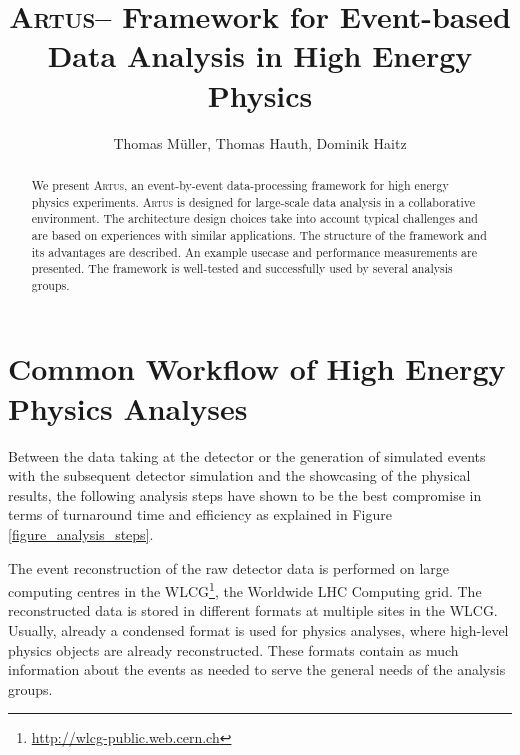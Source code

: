 \documentclass[3p]{elsarticle}
\newcommand{\software}[1]{\textsc{#1}\xspace}
\newcommand{\artus}{\software{Artus}}
\begin{document}
\begin{frontmatter}
\title{\artus -- Framework for Event-based Data Analysis in High Energy Physics}

\author[kit]{Thomas M\"uller, Thomas Hauth, Dominik Haitz}
\address[kit]{Karlsruhe Institute of Technology, Wolfgang-Gaede-Stra\ss{}e 1, D-76131 Karlsruhe}

\begin{abstract}
We present \artus, an event-by-event data-processing framework for high energy physics experiments. \artus is designed for large-scale data analysis in a collaborative environment.
The architecture design choices take into account typical challenges and are based on experiences with similar applications.
The structure of the framework and its advantages are described.
An example usecase and performance measurements are presented.
The framework is well-tested and successfully used by several analysis groups.
\end{abstract}

\end{frontmatter}


\section{Common Workflow of High Energy Physics Analyses \label{section_artus_analysis_workflow}}

Between the data taking at the detector or the generation of simulated events with the subsequent detector simulation and the showcasing of the physical results, the following analysis steps have shown to be the best compromise in terms of turnaround time and efficiency as explained in Figure \ref{figure_analysis_steps}.

The event reconstruction of the raw detector data is performed on large computing centres in the WLCG\footnote{\url{http://wlcg-public.web.cern.ch}}, the Worldwide LHC Computing grid. The reconstructed data is stored in different formats at multiple sites in the WLCG. Usually, already a condensed format is used for physics analyses, where high-level physics objects are already reconstructed. These formats contain as much information about the events as needed to serve the general needs of the analysis groups.
\end{document}

